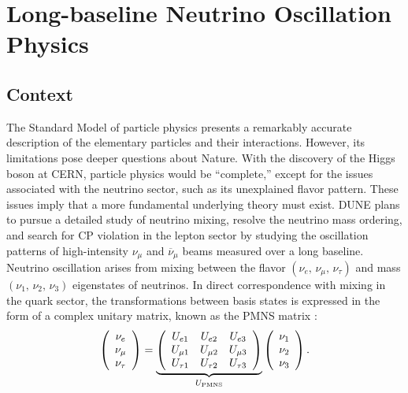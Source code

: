 \chapter{Long-baseline Neutrino Oscillation Physics}
\label{ch:physics-lbnosc}

\section{Context}
\label{sec:physics-lbnosc-context}

The Standard Model of particle physics 
presents a remarkably accurate
description of the elementary particles and their
interactions. However, its limitations pose deeper questions about
Nature. With the discovery of the Higgs boson at CERN, particle physics would be ``complete,'' except
for the issues associated with the neutrino sector, such as its unexplained flavor pattern.  These issues
imply that a more fundamental underlying theory must exist. 
DUNE plans to pursue a detailed
study of neutrino mixing, resolve the neutrino mass ordering,
and search for CP violation in the lepton sector by
studying the oscillation patterns of high-intensity
$\nu_\mu$ and $\overline{\nu}_\mu$ beams measured over a long baseline. 
Neutrino oscillation arises from mixing between the flavor $(\nu_e,\, \nu_\mu,\, \nu_\tau)$ and mass $(\nu_1,\, \nu_2,\, \nu_3)$
eigenstates of neutrinos.
In direct correspondence with mixing in the quark sector, the transformations
between basis states is expressed in the form of a complex unitary
matrix, known as the PMNS matrix :
\begin{equation}
\left(\begin{array}{ccc} \nu_e \\ \nu_\mu \\ \nu_\tau \end{array} \right)= 
\underbrace{
  \left(\begin{array}{ccc}
      U_{e 1} &  U_{e 2} & U_{e 3} \\ 
      U_{\mu1} &  U_{\mu2} & U_{\mu 3} \\ 
      U_{\tau 1} &  U_{\tau 2} & U_{\tau 3} 
    \end{array} \right)
}_{U_{\rm PMNS}} \left(\begin{array}{ccc} \nu_1 \\ \nu_2 \\ \nu_3 \end{array} \right).
\label{eqn:pmns0}
\end{equation}
